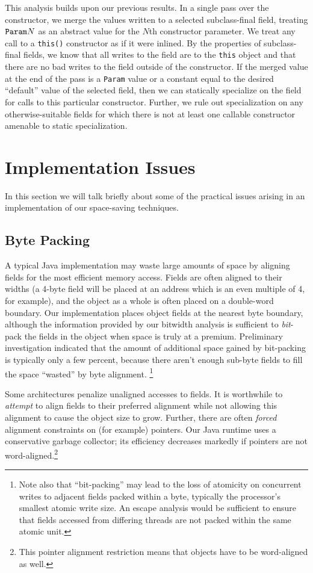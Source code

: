 \documentclass{sig-alt-full}
\begin{document}
This analysis builds upon our previous results.
In a single pass over the constructor, we merge the values written
to a selected subclass-final field, treating $\text{\tt Param}N$ as an
abstract value for the $N$th constructor parameter.
We treat any call to a {\tt this()}
constructor as if it were inlined.  By the properties of
subclass-final fields, we know that all writes to the
field are to the {\tt this} object and that there are no bad writes to
the field outside of the constructor.
If the merged value at the end of the pass 
is a {\tt Param} value or a constant equal to the desired ``default''
value of the selected field,
then we can statically specialize on the field for calls to this
particular constructor.
Further, we rule out specialization on any otherwise-suitable
fields for which there is not at least one callable constructor
amenable to static specialization.
%
\section{Implementation Issues}
%
In this section we will talk briefly about some of the practical
issues arising in an implementation of our space-saving techniques.
%
\subsection{Byte Packing}
%
A typical Java implementation may waste large amounts of space by
aligning fields for the most efficient memory access.  Fields are
often aligned to their widths (a 4-byte field will be placed at an address
which is an even multiple of 4, for example), and the object as a
whole is often placed on a double-word boundary. Our implementation
places object fields at the nearest byte boundary, although
the information provided by our bitwidth
analysis is sufficient to {\it bit}-pack the fields in the object
when space is truly at a premium.  Preliminary investigation
indicated that the amount of additional space gained by bit-packing 
is typically only a few percent, because there aren't enough sub-byte
fields to fill the space ``wasted'' by byte alignment.%
\footnote{Note also that ``bit-packing'' may lead to the loss of
atomicity on concurrent writes to adjacent fields packed within a byte,
typically the processor's smallest atomic write size.  An escape
analysis would be sufficient to ensure that fields accessed from
differing threads are not packed within the same atomic unit.}

Some architectures penalize unaligned accesses to fields.  It is
worthwhile to {\it attempt} to align fields to their preferred
alignment while not allowing this alignment to cause the object size to grow.
Further, there are often {\it forced} alignment constraints on
(for example) pointers.  Our Java runtime uses a conservative garbage
collector; its efficiency decreases markedly if pointers are not
word-aligned.\footnote{This pointer alignment restriction means that
  objects have to be word-aligned as well.}
\end{document}

